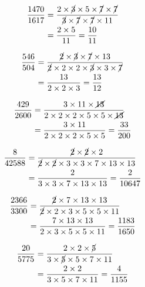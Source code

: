 {{\item\begin{align*}
    \frac{1470}{1617} &=
    \frac{2 \times \cancel{3} \times 5 \times \cancel{7} \times \cancel{7}}
    {\cancel{3} \times \cancel{7} \times \cancel{7} \times 11}\\ &=
    \frac{2 \times 5}
    {11} =
    \frac{10}{11}
    \end{align*}

\item\begin{align*}
    \frac{546}{504} &=
    \frac{\cancel{2} \times \cancel{3} \times \cancel{7} \times 13}
    {\cancel{2} \times 2 \times 2 \times \cancel{3} \times 3 \times \cancel{7}}\\ &=
    \frac{13}
    {2 \times 2 \times 3} =
    \frac{13}{12}
    \end{align*}

\item\begin{align*}
    \frac{429}{2600} &=
    \frac{3 \times 11 \times \cancel{13}}
    {2 \times 2 \times 2 \times 5 \times 5 \times \cancel{13}}\\ &=
    \frac{3 \times 11}
    {2 \times 2 \times 2 \times 5 \times 5} =
    \frac{33}{200}
    \end{align*}

\item\begin{align*}
    \frac{8}{42588} &=
    \frac{\cancel{2} \times \cancel{2} \times 2}
    {\cancel{2} \times \cancel{2} \times 3 \times 3 \times 7 \times 13 \times 13}\\ &=
    \frac{2}
    {3 \times 3 \times 7 \times 13 \times 13} =
    \frac{2}{10647}
    \end{align*}

\item\begin{align*}
    \frac{2366}{3300} &=
    \frac{\cancel{2} \times 7 \times 13 \times 13}
    {\cancel{2} \times 2 \times 3 \times 5 \times 5 \times 11}\\ &=
    \frac{7 \times 13 \times 13}
    {2 \times 3 \times 5 \times 5 \times 11} =
    \frac{1183}{1650}
    \end{align*}

\item\begin{align*}
    \frac{20}{5775} &=
    \frac{2 \times 2 \times \cancel{5}}
    {3 \times \cancel{5} \times 5 \times 7 \times 11}\\ &=
    \frac{2 \times 2}
    {3 \times 5 \times 7 \times 11} =
    \frac{4}{1155}
    \end{align*}

}}
